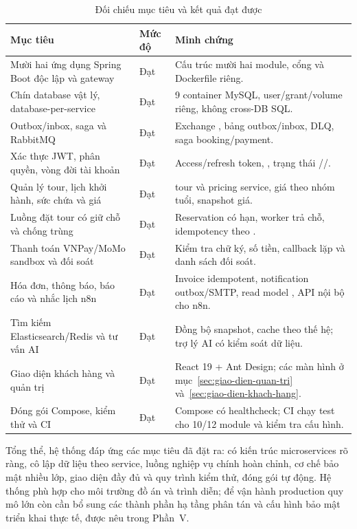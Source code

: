 \begin{table}[H]
\centering
\caption{Đối chiếu mục tiêu và kết quả đạt được}
\label{tab:danh-gia}
\small
\begin{tabularx}{\textwidth}{@{}L{5.4cm}L{2.6cm}Y@{}}
\toprule
\textbf{Mục tiêu} & \textbf{Mức độ} & \textbf{Minh chứng}\\
\midrule
Mười hai ứng dụng Spring Boot độc lập và gateway & Đạt & Cấu trúc mười hai module, cổng và Dockerfile riêng.\\
Chín database vật lý, database-per-service & Đạt & 9 container MySQL, user/grant/volume riêng, không cross-DB SQL.\\
Outbox/inbox, saga và RabbitMQ & Đạt & Exchange , bảng outbox/inbox, DLQ, saga booking/payment.\\
Xác thực JWT, phân quyền, vòng đời tài khoản & Đạt & Access/refresh token, , trạng thái //.\\
Quản lý tour, lịch khởi hành, sức chứa và giá & Đạt & tour và pricing service, giá theo nhóm tuổi, snapshot giá.\\
Luồng đặt tour có giữ chỗ và chống trùng & Đạt & Reservation có hạn, worker trả chỗ, idempotency theo .\\
Thanh toán VNPay/MoMo sandbox và đối soát & Đạt & Kiểm tra chữ ký, số tiền, callback lặp và danh sách đối soát.\\
Hóa đơn, thông báo, báo cáo và nhắc lịch n8n & Đạt & Invoice idempotent, notification outbox/SMTP, read model , API nội bộ cho n8n.\\
Tìm kiếm Elasticsearch/Redis và tư vấn AI & Đạt & Đồng bộ snapshot, cache theo thế hệ; trợ lý AI có kiểm soát dữ liệu.\\
Giao diện khách hàng và quản trị & Đạt & React 19 + Ant Design; các màn hình ở mục~\ref{sec:giao-dien-quan-tri} và~\ref{sec:giao-dien-khach-hang}.\\
Đóng gói Compose, kiểm thử và CI & Đạt & Compose có healthcheck; CI chạy test cho 10/12 module và kiểm tra cấu hình.\\
\bottomrule
\end{tabularx}
\end{table}

Tổng thể, hệ thống đáp ứng các mục tiêu đã đặt ra: có kiến trúc microservices rõ ràng, cô lập dữ liệu theo service, luồng nghiệp vụ chính hoàn chỉnh, cơ chế bảo mật nhiều lớp, giao diện đầy đủ và quy trình kiểm thử, đóng gói tự động. Hệ thống phù hợp cho môi trường đồ án và trình diễn; để vận hành production quy mô lớn còn cần bổ sung các thành phần hạ tầng phân tán và cấu hình bảo mật triển khai thực tế, được nêu trong Phần~V.